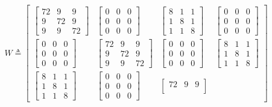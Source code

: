 \begin{equation}\label{eq:inversion-weights}
W\triangleq
\begin{bmatrix}
\begin{bmatrix}
72 & 9 & 9\\
9 & 72 & 9\\
9 & 9 & 72
\end{bmatrix}
&
\begin{bmatrix}
0 & 0 & 0\\
0 & 0 & 0\\
0 & 0 & 0
\end{bmatrix}
&
\begin{bmatrix}
8 & 1 & 1\\
1 & 8 & 1\\
1 & 1 & 8
\end{bmatrix}
&
\begin{bmatrix}
0 & 0 & 0\\
0 & 0 & 0\\
0 & 0 & 0
\end{bmatrix}
\\
\begin{bmatrix}
0 & 0 & 0\\
0 & 0 & 0\\
0 & 0 & 0
\end{bmatrix}
&
\begin{bmatrix}
72 & 9 & 9\\
9 & 72 & 9\\
9 & 9 & 72
\end{bmatrix}
&
\begin{bmatrix}
0 & 0 & 0\\
0 & 0 & 0\\
0 & 0 & 0
\end{bmatrix}
&
\begin{bmatrix}
8 & 1 & 1\\
1 & 8 & 1\\
1 & 1 & 8
\end{bmatrix}
\\
\begin{bmatrix}
8 & 1 & 1\\
1 & 8 & 1\\
1 & 1 & 8
\end{bmatrix}
&
\begin{bmatrix}
0 & 0 & 0\\
0 & 0 & 0\\
0 & 0 & 0
\end{bmatrix}
&
\begin{bmatrix}
72 & 9 & 9\\

\end{bmatrix}
\end{bmatrix}
\end{equation}
